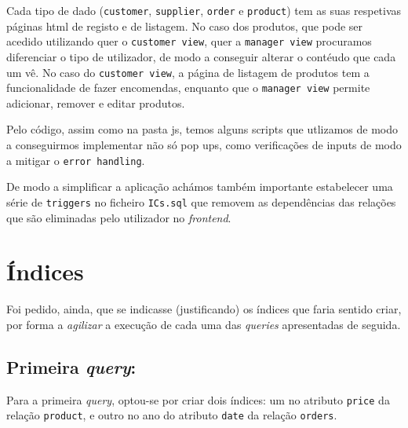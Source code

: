 \documentclass[12pt,a4paper]{article}
\begin{document}
Cada tipo de dado (\texttt{customer}, \texttt{supplier}, \texttt{order} e \texttt{product}) tem as suas respetivas páginas html de
registo e de listagem. No caso dos produtos, que pode ser acedido utilizando quer o \texttt{customer view},
quer a \texttt{manager view} procuramos diferenciar o tipo de utilizador, de modo a conseguir alterar o
contéudo que cada um vê. No caso do \texttt{customer view}, a página de listagem de produtos tem a funcionalidade
de fazer encomendas, enquanto que o \texttt{manager view} permite adicionar, remover e editar produtos.

Pelo código, assim como na pasta js, temos alguns scripts que utlizamos de modo
a conseguirmos implementar não só pop ups, como verificações de inputs de modo
a mitigar o \texttt{error handling}.

De modo a simplificar a aplicação achámos também importante estabelecer uma série de \texttt{triggers} no ficheiro \texttt{ICs.sql}
que removem as dependências das relações que são eliminadas pelo utilizador no \textit{frontend}.

\section*{Índices}

Foi pedido, ainda, que se indicasse (justificando) os índices que faria sentido
criar, por forma a \textit{agilizar} a execução de cada uma das \textit{queries}
apresentadas de seguida.

\subsection*{Primeira \textit{query}:}



Para a primeira \textit{query}, optou-se por criar dois índices: um no atributo
\texttt{price} da relação \texttt{product}, e outro no ano do atributo \texttt{date}
da relação \texttt{orders}.

\vspace*{0.25cm}
\end{document}
